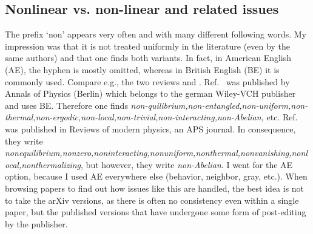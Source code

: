 \subsection{Nonlinear vs. non-linear and related issues}
The prefix `non' appears very often and with many different following words. My impression was that it is not treated uniformly in the literature (even by the same authors) and that one finds both variants. In fact, in American English (AE), the hyphen is mostly omitted, whereas in British English (BE) it is commonly used. Compare e.g., the two reviews \cite{abaninRecentProgressManybody2017} and \cite{abaninColloquiumManybodyLocalization2019}. Ref.~\cite{abaninRecentProgressManybody2017} was published by Annals of Physics (Berlin) which belongs to the german Wiley-VCH publisher and uses BE. Therefore one finds \emph{non-quilibrium,non-entangled,non-uniform,non-thermal,non-ergodic,non-local,non-trivial,non-interacting,non-Abelian,} etc.
Ref.~\cite{abaninColloquiumManybodyLocalization2019} was published in Reviews of modern physics, an APS journal. In consequence, they write \emph{nonequilibrium,nonzero,noninteracting,nonuniform,nonthermal,nonvanishing,nonlocal,nonthermalizing}, but however, they write \emph{non-Abelian}. I went for the AE option, because I used AE everywhere else (behavior, neighbor, gray, etc.).
When browsing papers to find out how issues like this are handled, the best idea is not to take the arXiv versions, as there is often no consistency even within a single paper, but the published versions that have undergone some form of post-editing by the publisher.


